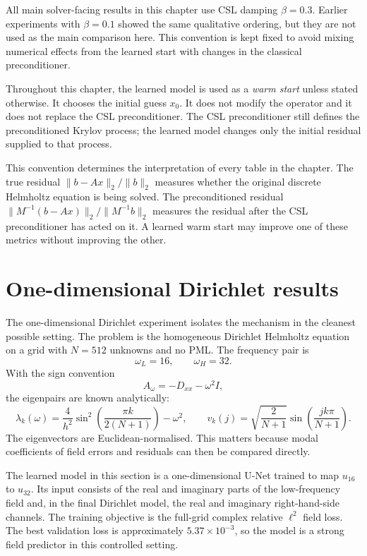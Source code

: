 All main solver-facing results in this chapter use CSL damping
$\beta=0.3$. Earlier experiments with $\beta=0.1$ showed the same qualitative
ordering, but they are not used as the main comparison here. This convention is
kept fixed to avoid mixing numerical effects from the learned start with
changes in the classical preconditioner.

Throughout this chapter, the learned model is used as a \emph{warm start}
unless stated otherwise. It chooses the initial guess $x_0$. It does not
modify the operator and it does not replace the CSL preconditioner. The CSL
preconditioner still defines the preconditioned Krylov process; the learned
model changes only the initial residual supplied to that process.

This convention determines the interpretation of every table in the chapter.
The true residual $\|b-Ax\|_2/\|b\|_2$ measures whether the original discrete
Helmholtz equation is being solved. The preconditioned residual
$\|M^{-1}(b-Ax)\|_2/\|M^{-1}b\|_2$ measures the residual after the CSL
preconditioner has acted on it. A learned warm start may improve one of these
metrics without improving the other.

\section{One-dimensional Dirichlet results}
\label{sec:results-1d}

The one-dimensional Dirichlet experiment isolates the mechanism in the cleanest
possible setting. The problem is the homogeneous Dirichlet Helmholtz equation
on a grid with $N=512$ unknowns and no PML. The frequency pair is
\[
    \omega_L = 16,
    \qquad
    \omega_H = 32.
\]
With the sign convention
\[
    A_\omega = -D_{xx} - \omega^2 I,
\]
the eigenpairs are known analytically:
\begin{equation}
    \lambda_k(\omega)
    =
    \frac{4}{h^2}
    \sin^2\!\left(\frac{\pi k}{2(N+1)}\right)
    -
    \omega^2,
    \qquad
    v_k(j)
    =
    \sqrt{\frac{2}{N+1}}
    \sin\!\left(\frac{j k \pi}{N+1}\right).
    \label{eq:results-dirichlet-eigenpairs}
\end{equation}
The eigenvectors are Euclidean-normalised. This matters because modal
coefficients of field errors and residuals can then be compared directly.

The learned model in this section is a one-dimensional U-Net trained to map
$u_{16}$ to $u_{32}$. Its input consists of the real and imaginary parts of the
low-frequency field and, in the final Dirichlet model, the real and imaginary
right-hand-side channels. The training objective is the full-grid complex
relative $\ell^2$ field loss. The best validation loss is approximately
$5.37\times 10^{-3}$, so the model is a strong field predictor in this
controlled setting.

